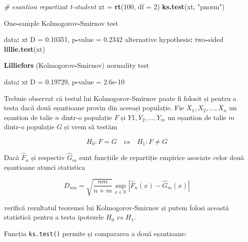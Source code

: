 \documentclass[]{article}
\newenvironment{Shaded}{\begin{snugshade}}{\end{snugshade}}
\newcommand{\KeywordTok}[1]{\textcolor[rgb]{0.13,0.29,0.53}{\textbf{#1}}}
\newcommand{\DataTypeTok}[1]{\textcolor[rgb]{0.13,0.29,0.53}{#1}}
\newcommand{\DecValTok}[1]{\textcolor[rgb]{0.00,0.00,0.81}{#1}}
\newcommand{\FloatTok}[1]{\textcolor[rgb]{0.00,0.00,0.81}{#1}}
\newcommand{\StringTok}[1]{\textcolor[rgb]{0.31,0.60,0.02}{#1}}
\newcommand{\CommentTok}[1]{\textcolor[rgb]{0.56,0.35,0.01}{\textit{#1}}}
\newcommand{\OperatorTok}[1]{\textcolor[rgb]{0.81,0.36,0.00}{\textbf{#1}}}
\newcommand{\NormalTok}[1]{#1}
\begin{document}
\begin{Shaded}
\begin{Highlighting}[]
\CommentTok{# esantion repartizat t-student}
\NormalTok{xt =}\StringTok{ }\KeywordTok{rt}\NormalTok{(}\DecValTok{100}\NormalTok{, }\DataTypeTok{df =} \DecValTok{2}\NormalTok{)}
\KeywordTok{ks.test}\NormalTok{(xt, }\StringTok{"pnorm"}\NormalTok{)}

\NormalTok{    One}\OperatorTok{-}\NormalTok{sample Kolmogorov}\OperatorTok{-}\NormalTok{Smirnov test}

\NormalTok{data}\OperatorTok{:}\StringTok{  }\NormalTok{xt}
\NormalTok{D =}\StringTok{ }\FloatTok{0.10351}\NormalTok{, p}\OperatorTok{-}\NormalTok{value =}\StringTok{ }\FloatTok{0.2342}
\NormalTok{alternative hypothesis}\OperatorTok{:}\StringTok{ }\NormalTok{two}\OperatorTok{-}\NormalTok{sided}
\KeywordTok{lillie.test}\NormalTok{(xt)}

    \KeywordTok{Lilliefors}\NormalTok{ (Kolmogorov}\OperatorTok{-}\NormalTok{Smirnov) normality test}

\NormalTok{data}\OperatorTok{:}\StringTok{  }\NormalTok{xt}
\NormalTok{D =}\StringTok{ }\FloatTok{0.19729}\NormalTok{, p}\OperatorTok{-}\NormalTok{value =}\StringTok{ }\FloatTok{2.6e-10}
\end{Highlighting}
\end{Shaded}

Trebuie observat că testul lui Kolmogorov-Smirnov poate fi folosit și
pentru a testa dacă două eșantioane provin din aceeași populație. Fie
\(X_1, X_2, \ldots, X_n\) un eșantion de talie \(n\) dintr-o populație
\(F\) și \(Y1, Y_2, \ldots, Y_m\) un eșantion de talie \(m\) dintr-o
populație \(G\) și vrem să testăm

\[
  H_0: F = G \quad vs\quad H_1: F\neq G
\]

Dacă \(\hat{F}_n\) și respectiv \(\hat{G}_m\) sunt funcțiile de
repartiție empirice asociate celor două eșantioane atunci statistica

\[
  D_{nm} = \sqrt{\frac{nm}{n+m}}\sup_{x\in\mathbb{R}}\left|\hat{F}_n(x) - \hat{G}_m(x)\right|
\]

verifică rezultatul teoremei lui Kolmogorov-Smirnov și putem folosi
această statistică pentru a testa ipotezele \(H_0\,\, vs\,\, H_1\).

Funcția \texttt{ks.test()} permite și compararea a două eșantioane:
\end{document}
